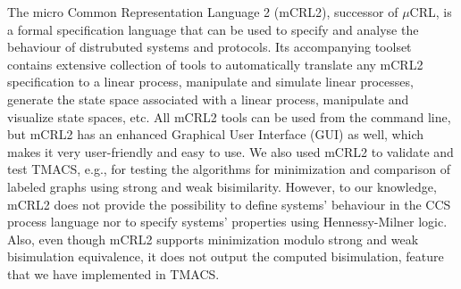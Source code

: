 The micro Common Representation Language 2 (mCRL2), successor of $\mu$CRL, is a formal specification language that can be used to specify and analyse the behaviour of distrubuted systems and protocols. Its accompanying toolset contains extensive collection of tools to automatically translate any mCRL2 specification to a linear process, manipulate and simulate linear processes, generate the state space associated with a linear process, manipulate and visualize state spaces, etc. All mCRL2 tools can be used from the command line, but mCRL2 has an enhanced Graphical User Interface (GUI) as well, which makes it very user-friendly and easy to use. We also used mCRL2 to validate and test TMACS, e.g., for testing the algorithms for minimization and comparison of labeled graphs using strong and weak bisimilarity. However, to our knowledge, mCRL2 does not provide the possibility to define systems' behaviour in the CCS process language nor to specify systems' properties using Hennessy-Milner logic. Also, even though mCRL2 supports minimization modulo strong and weak bisimulation equivalence, it does not output the computed bisimulation, feature that we have implemented in TMACS.  

